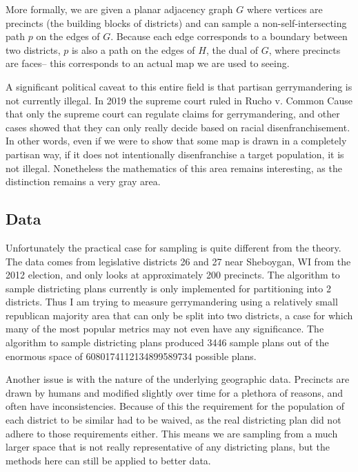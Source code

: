 \documentclass[a4paper]{article}
\theoremstyle{definition}
\begin{document}
	More formally, we are given a planar adjacency graph $ G $ where vertices are precincts (the building blocks of districts) and can sample a non-self-intersecting path $ p $ on the edges of $ G $. Because each edge corresponds to a boundary between two districts, $ p $ is also a path on the edges of $ H $, the dual of $ G $, where precincts are faces-- this corresponds to an actual map we are used to seeing. 
	
	A significant political caveat to this entire field is that partisan gerrymandering is not currently illegal. In 2019 the supreme court ruled in Rucho v. Common Cause that only the supreme court can regulate claims for gerrymandering, and other cases showed that they can only really decide based on racial disenfranchisement. In other words, even if we were to show that some map is drawn in a completely partisan way, if it does not intentionally disenfranchise a target population, it is not illegal. Nonetheless the mathematics of this area remains interesting, as the distinction remains a very gray area.
	
	\subsection{Data}\label{data}
	
	Unfortunately the practical case for sampling is quite different from the theory. The data comes from legislative districts 26 and 27 near Sheboygan, WI from the 2012 election, and only looks at approximately 200 precincts. The algorithm to sample districting plans currently is only implemented for partitioning into 2 districts. Thus I am trying to measure gerrymandering using a relatively small republican majority area that can only be split into two districts, a case for which many of the most popular metrics may not even have any significance. The algorithm to sample districting plans produced 3446 sample plans out of the enormous space of 6080174112134899589734 possible plans.
	
	Another issue is with the nature of the underlying geographic data. Precincts are drawn by humans and modified slightly over time for a plethora of reasons, and often have inconsistencies. Because of this the requirement for the population of each district to be similar had to be waived, as the real districting plan did not adhere to those requirements either. This means we are sampling from a much larger space that is not really representative of any districting plans, but the methods here can still be applied to better data.
	
\end{document}
